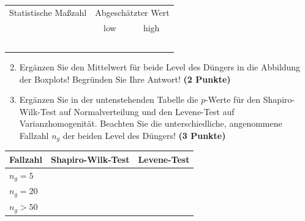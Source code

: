 \documentclass[a4paper, 10pt]{scrartcl}\usepackage[]{graphicx}\usepackage[]{xcolor}
\begin{document}
\begin{center}
  \large
  \begin{tabular}[c]{c|c|c}
    Statistische Ma{\ss}zahl  & \multicolumn{2}{c}{Abgesch{\"a}tzter Wert}  \strut\\
    & low & high \\
    \hline
    \hspace{2cm} & \hspace{2cm} & \hspace{2cm} \strut\\
    \hline
    \hspace{2cm} & \hspace{2cm} & \hspace{2cm} \strut\\
    \hline
    \hspace{2cm} & \hspace{2cm} & \hspace{2cm} \strut\\
    \hline
    \hspace{2cm} & \hspace{2cm} & \hspace{2cm} \strut\\
    \hline
    \hspace{2cm} & \hspace{2cm} & \hspace{2cm} \strut\\
    \hline
  \end{tabular}
\end{center}


\begin{enumerate}
  \setcounter{enumi}{1}
\item Erg{\"a}nzen Sie den Mittelwert f{\"u}r beide Level des D{\"u}ngers in die
  Abbildung der Boxplots! Begr{\"u}nden Sie Ihre Antwort! \textbf{(2 Punkte)}
\item Erg{\"a}nzen Sie in der untenstehenden Tabelle die $p$-Werte f{\"u}r den
  Shapiro-Wilk-Test auf Normalverteilung und den Levene-Test auf
  Varianzhomogenit{\"a}t. Beachten Sie die unterschiedliche, angenommene
  Fallzahl $n_g$ der beiden Level des D{\"u}ngers! \textbf{(3 Punkte)}
\end{enumerate}

\begin{center}
  \large
  \begin{tabular}[c]{l|c|c}
  Fallzahl  & Shapiro-Wilk-Test & Levene-Test \strut\\ 
    \hline
    \textbf{$n_g = 5$} & \hspace{4cm} & \hspace{4cm} \strut\\
    \hline
    \textbf{$n_g = 20$} & \hspace{4cm} & \hspace{4cm} \strut\\
    \hline
    \textbf{$n_g > 50$} & \hspace{4cm} & \hspace{4cm} \strut\\
    \hline
  \end{tabular}
\end{center} 
\clearpage
\end{document}

